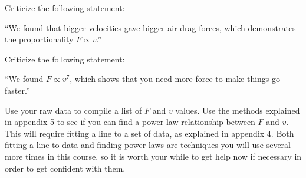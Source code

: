 \prelabquestion Criticize the following statement:

``We found that bigger velocities gave bigger air drag
forces, which demonstrates the proportionality $F\propto v$.''

\prelabquestion Criticize the following statement:

``We found $F\propto v^7$, which shows that you need more
force to make things go faster.''

\analysis

Use your raw data to compile a list of $F$ and $v$ values.
Use the methods explained in appendix 5  to see if you can
find a power-law relationship between $F$ and $v$. This will
require fitting a line to a set of data, as explained in
appendix 4. Both fitting a line to data and finding power
laws are techniques you will use several more times in this
course, so it is worth your while to get help now if
necessary in order to get confident with them.
